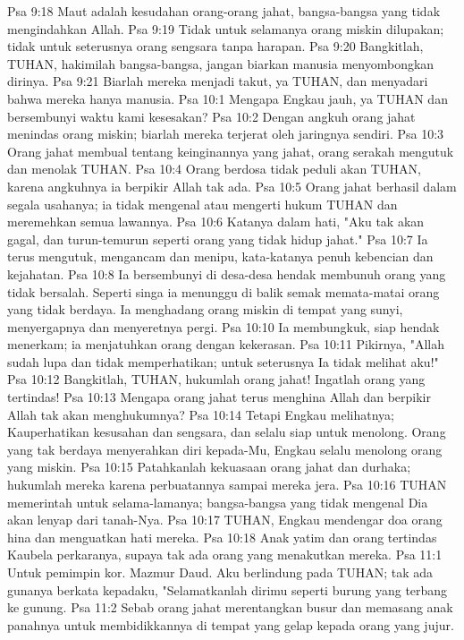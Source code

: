 Psa 9:18  Maut adalah kesudahan orang-orang jahat, bangsa-bangsa yang tidak mengindahkan Allah.
Psa 9:19  Tidak untuk selamanya orang miskin dilupakan; tidak untuk seterusnya orang sengsara tanpa harapan.
Psa 9:20  Bangkitlah, TUHAN, hakimilah bangsa-bangsa, jangan biarkan manusia menyombongkan dirinya.
Psa 9:21  Biarlah mereka menjadi takut, ya TUHAN, dan menyadari bahwa mereka hanya manusia.
Psa 10:1  Mengapa Engkau jauh, ya TUHAN dan bersembunyi waktu kami kesesakan?
Psa 10:2  Dengan angkuh orang jahat menindas orang miskin; biarlah mereka terjerat oleh jaringnya sendiri.
Psa 10:3  Orang jahat membual tentang keinginannya yang jahat, orang serakah mengutuk dan menolak TUHAN.
Psa 10:4  Orang berdosa tidak peduli akan TUHAN, karena angkuhnya ia berpikir Allah tak ada.
Psa 10:5  Orang jahat berhasil dalam segala usahanya; ia tidak mengenal atau mengerti hukum TUHAN dan meremehkan semua lawannya.
Psa 10:6  Katanya dalam hati, "Aku tak akan gagal, dan turun-temurun seperti orang yang tidak hidup jahat."
Psa 10:7  Ia terus mengutuk, mengancam dan menipu, kata-katanya penuh kebencian dan kejahatan.
Psa 10:8  Ia bersembunyi di desa-desa hendak membunuh orang yang tidak bersalah. Seperti singa ia menunggu di balik semak memata-matai orang yang tidak berdaya. Ia menghadang orang miskin di tempat yang sunyi, menyergapnya dan menyeretnya pergi.
Psa 10:10  Ia membungkuk, siap hendak menerkam; ia menjatuhkan orang dengan kekerasan.
Psa 10:11  Pikirnya, "Allah sudah lupa dan tidak memperhatikan; untuk seterusnya Ia tidak melihat aku!"
Psa 10:12  Bangkitlah, TUHAN, hukumlah orang jahat! Ingatlah orang yang tertindas!
Psa 10:13  Mengapa orang jahat terus menghina Allah dan berpikir Allah tak akan menghukumnya?
Psa 10:14  Tetapi Engkau melihatnya; Kauperhatikan kesusahan dan sengsara, dan selalu siap untuk menolong. Orang yang tak berdaya menyerahkan diri kepada-Mu, Engkau selalu menolong orang yang miskin.
Psa 10:15  Patahkanlah kekuasaan orang jahat dan durhaka; hukumlah mereka karena perbuatannya sampai mereka jera.
Psa 10:16  TUHAN memerintah untuk selama-lamanya; bangsa-bangsa yang tidak mengenal Dia akan lenyap dari tanah-Nya.
Psa 10:17  TUHAN, Engkau mendengar doa orang hina dan menguatkan hati mereka.
Psa 10:18  Anak yatim dan orang tertindas Kaubela perkaranya, supaya tak ada orang yang menakutkan mereka.
Psa 11:1  Untuk pemimpin kor. Mazmur Daud. Aku berlindung pada TUHAN; tak ada gunanya berkata kepadaku, "Selamatkanlah dirimu seperti burung yang terbang ke gunung.
Psa 11:2  Sebab orang jahat merentangkan busur dan memasang anak panahnya untuk membidikkannya di tempat yang gelap kepada orang yang jujur.
